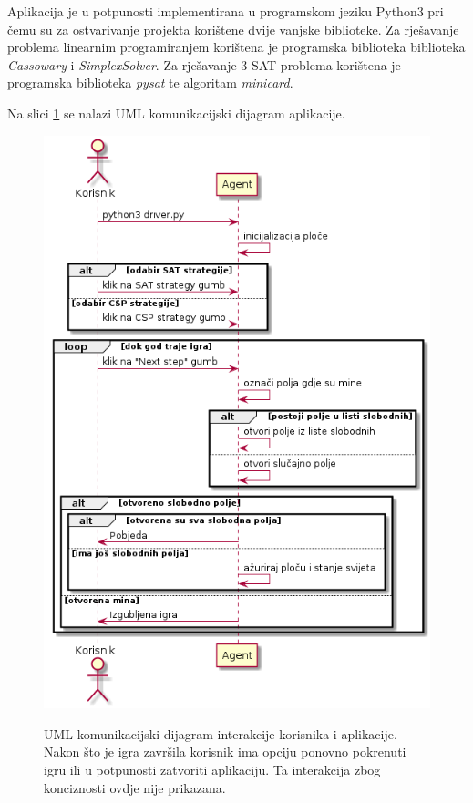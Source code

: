 \documentclass{article}
\begin{document}
Aplikacija je u potpunosti implementirana u programskom jeziku Python3 pri čemu su za
ostvarivanje projekta korištene dvije vanjske biblioteke. Za rješavanje problema linearnim
programiranjem korištena je programska biblioteka biblioteka \textit{Cassowary} i
\textit{SimplexSolver}. Za rješavanje 3-SAT problema korištena je programska biblioteka
\textit{pysat} te algoritam \textit{minicard}.

Na slici \ref{img:UML_komunikacijski} se nalazi UML komunikacijski dijagram aplikacije.

\begin{figure}[ht]
    \centering
    \includegraphics[width=\textwidth]{images/seq_diagram.png}
    \label{img:UML_komunikacijski}
    \caption{UML komunikacijski dijagram interakcije korisnika i aplikacije. Nakon što je
    igra završila korisnik ima opciju ponovno pokrenuti igru ili u potpunosti zatvoriti
    aplikaciju. Ta interakcija zbog konciznosti ovdje nije prikazana.}
\end{figure}
\end{document}

